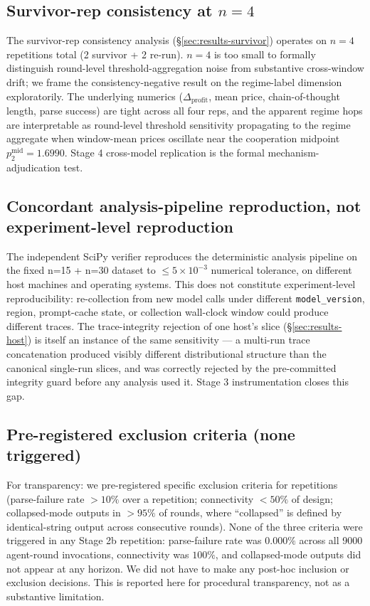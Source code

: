 \subsection{Survivor-rep consistency at $n = 4$}
\label{sec:limitations-survivor}

The survivor-rep consistency analysis (\S\ref{sec:results-survivor}) operates on $n = 4$ repetitions total (2 survivor + 2 re-run). $n = 4$ is too small to formally distinguish round-level threshold-aggregation noise from substantive cross-window drift; we frame the consistency-negative result on the regime-label dimension exploratorily. The underlying numerics ($\Delta_{\text{profit}}$, mean price, chain-of-thought length, parse success) are tight across all four reps, and the apparent regime hops are interpretable as round-level threshold sensitivity propagating to the regime aggregate when window-mean prices oscillate near the cooperation midpoint $p^{\text{mid}}_2 = 1.6990$. Stage 4 cross-model replication is the formal mechanism-adjudication test.

\subsection{Concordant analysis-pipeline reproduction, not experiment-level reproduction}
\label{sec:limitations-repro-scope}

The independent SciPy verifier reproduces the deterministic analysis pipeline on the fixed n=15 + n=30 dataset to $\leq 5 \times 10^{-3}$ numerical tolerance, on different host machines and operating systems. This does not constitute experiment-level reproducibility: re-collection from new model calls under different \texttt{model\_version}, region, prompt-cache state, or collection wall-clock window could produce different traces. The trace-integrity rejection of one host's slice (\S\ref{sec:results-host}) is itself an instance of the same sensitivity --- a multi-run trace concatenation produced visibly different distributional structure than the canonical single-run slices, and was correctly rejected by the pre-committed integrity guard before any analysis used it. Stage 3 instrumentation closes this gap.

\subsection{Pre-registered exclusion criteria (none triggered)}
\label{sec:limitations-exclusions}

For transparency: we pre-registered specific exclusion criteria for repetitions (parse-failure rate $> 10\%$ over a repetition; connectivity $< 50\%$ of design; collapsed-mode outputs in $> 95\%$ of rounds, where ``collapsed'' is defined by identical-string output across consecutive rounds). None of the three criteria were triggered in any Stage 2b repetition: parse-failure rate was $0.000\%$ across all 9000 agent-round invocations, connectivity was $100\%$, and collapsed-mode outputs did not appear at any horizon. We did not have to make any post-hoc inclusion or exclusion decisions. This is reported here for procedural transparency, not as a substantive limitation.

